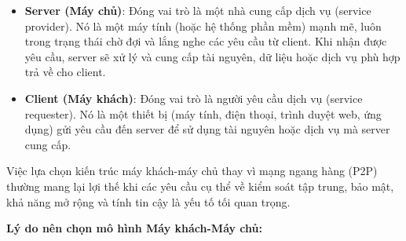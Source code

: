 \documentclass[a4paper, 15pt]{article}
\begin{document}
\begin{itemize}
    \item \textbf{Server (Máy chủ)}: Đóng vai trò là một nhà cung cấp dịch vụ (service provider). Nó là một máy tính (hoặc hệ thống phần mềm) mạnh mẽ, luôn trong trạng thái chờ đợi và lắng nghe các yêu cầu từ client. Khi nhận được yêu cầu, server sẽ xử lý và cung cấp tài nguyên, dữ liệu hoặc dịch vụ phù hợp trả về cho client.
    \item \textbf{Client (Máy khách)}: Đóng vai trò là người yêu cầu dịch vụ (service requester). Nó là một thiết bị (máy tính, điện thoại, trình duyệt web, ứng dụng) gửi yêu cầu đến server để sử dụng tài nguyên hoặc dịch vụ mà server cung cấp.
\end{itemize}

Việc lựa chọn kiến trúc máy khách-máy chủ thay vì mạng ngang hàng (P2P) thường mang lại lợi thế khi các yêu cầu cụ thể về kiểm soát tập trung, bảo mật, khả năng mở rộng và tính tin cậy là yếu tố tối quan trọng.

\textbf{Lý do nên chọn mô hình Máy khách-Máy chủ:}
\end{document}
